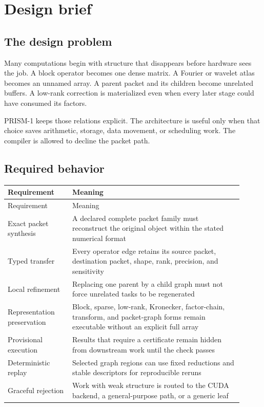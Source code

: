 \documentclass[11pt,oneside,openany]{book}
\theoremstyle{remark}
\begin{document}
\clearpage
\tableofcontents
\clearpage
\listoffigures

\clearpage
\mainmatter
\chapter{Design brief}

\section{The design problem}
Many computations begin with structure that disappears before hardware sees the job. A block operator becomes one dense matrix. A Fourier or wavelet atlas becomes an unnamed array. A parent packet and its children become unrelated buffers. A low-rank correction is materialized even when every later stage could have consumed its factors.

PRISM-1 keeps those relations explicit. The architecture is useful only when that choice saves arithmetic, storage, data movement, or scheduling work. The compiler is allowed to decline the packet path.

\section{Required behavior}
\begin{longtable}{L{0.25\linewidth}L{0.66\linewidth}}
\toprule
Requirement & Meaning \\
\midrule
\endfirsthead
\toprule
Requirement & Meaning \\
\midrule
\endhead
Exact packet synthesis & A declared complete packet family must reconstruct the original object within the stated numerical format \\
Typed transfer & Every operator edge retains its source packet, destination packet, shape, rank, precision, and sensitivity \\
Local refinement & Replacing one parent by a child graph must not force unrelated tasks to be regenerated \\
Representation preservation & Block, sparse, low-rank, Kronecker, factor-chain, transform, and packet-graph forms remain executable without an explicit full array \\
Provisional execution & Results that require a certificate remain hidden from downstream work until the check passes \\
Deterministic replay & Selected graph regions can use fixed reductions and stable descriptors for reproducible reruns \\
Graceful rejection & Work with weak structure is routed to the CUDA backend, a general-purpose path, or a generic leaf \\
\bottomrule
\end{longtable}
\end{document}
